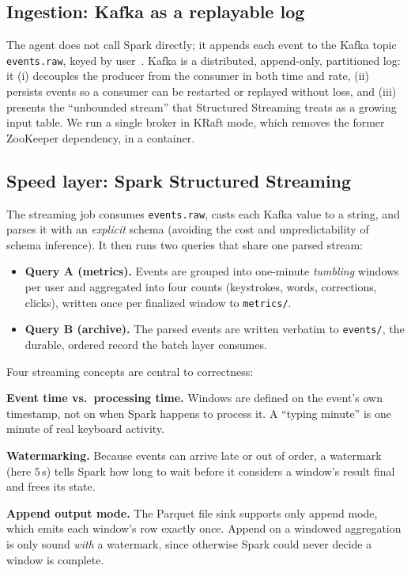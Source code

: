 \documentclass[conference]{IEEEtran}
\begin{document}
\subsection{Ingestion: Kafka as a replayable log}
The agent does not call Spark directly; it appends each event to the
Kafka topic \texttt{events.raw}, keyed by user~\cite{kreps2011kafka}.
Kafka is a distributed, append-only, partitioned log: it (i) decouples
the producer from the consumer in both time and rate, (ii) persists
events so a consumer can be restarted or replayed without loss, and
(iii) presents the ``unbounded stream'' that Structured Streaming treats
as a growing input table. We run a single broker in KRaft mode, which
removes the former ZooKeeper dependency, in a container.

\subsection{Speed layer: Spark Structured Streaming}
\label{sec:streaming}
The streaming job consumes \texttt{events.raw}, casts each Kafka value to
a string, and parses it with an \emph{explicit} schema (avoiding the cost
and unpredictability of schema inference). It then runs two queries that
share one parsed stream:

\begin{itemize}
  \item \textbf{Query A (metrics).} Events are grouped into one-minute
        \emph{tumbling} windows per user and aggregated into four counts
        (keystrokes, words, corrections, clicks), written once per
        finalized window to \texttt{metrics/}.
  \item \textbf{Query B (archive).} The parsed events are written
        verbatim to \texttt{events/}, the durable, ordered record the
        batch layer consumes.
\end{itemize}

Four streaming concepts are central to correctness:

\textbf{Event time vs.\ processing time.} Windows are defined on the
event's own timestamp, not on when Spark happens to process it. A
``typing minute'' is one minute of real keyboard activity.

\textbf{Watermarking.} Because events can arrive late or out of order,
a watermark (here $5$\,s) tells Spark how long to wait before it
considers a window's result final and frees its state.

\textbf{Append output mode.} The Parquet file sink supports only append
mode, which emits each window's row exactly once. Append on a windowed
aggregation is only sound \emph{with} a watermark, since otherwise Spark
could never decide a window is complete.
\end{document}
